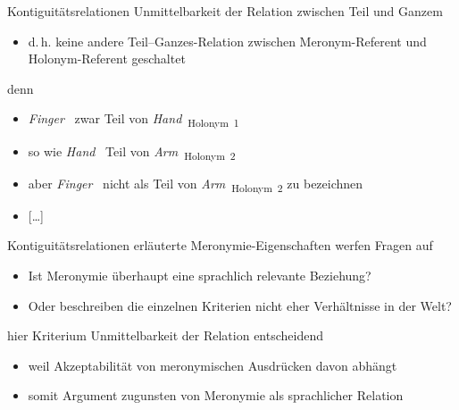 \begin{frame}{Kontiguitätsrelationen}
\onslide<+->
Unmittelbarkeit der Relation zwischen Teil und Ganzem
\begin{itemize}[<+->]
	\item		d.\,h. keine andere Teil–Ganzes-Relation zwischen Meronym-Referent und Holonym-Referent geschaltet
\end{itemize}
\onslide<+->
\Zeile
denn
\begin{itemize}[<+->]
	\item		\textit{Finger}~\textsubscript{} zwar Teil von \textit{Hand}~\textsubscript{\alert{Holonym~1}}
	\item		so wie \textit{Hand}~\textsubscript{} Teil von \textit{Arm}~\textsubscript{\alert{Holonym~2}}
	\item		aber \textit{Finger}~\textsubscript{} nicht als Teil von \textit{Arm}~\textsubscript{\alert{Holonym~2}} zu bezeichnen
	\item		{[\ldots]}
\end{itemize}
\end{frame}

\begin{frame}{Kontiguitätsrelationen}
\onslide<+->
erläuterte Meronymie-Eigenschaften werfen Fragen auf
\begin{itemize}[<+->]
	\item		Ist Meronymie überhaupt eine sprachlich relevante Beziehung?
	\item		Oder beschreiben die einzelnen Kriterien nicht eher Verhältnisse in der Welt?
\end{itemize}
\onslide<+->
\Zeile
hier Kriterium Unmittelbarkeit der Relation entscheidend
\begin{itemize}[<+->]
	\item		weil Akzeptabilität von meronymischen Ausdrücken davon abhängt
	\item		somit Argument zugunsten von Meronymie als sprachlicher Relation
\end{itemize}
\end{frame}

